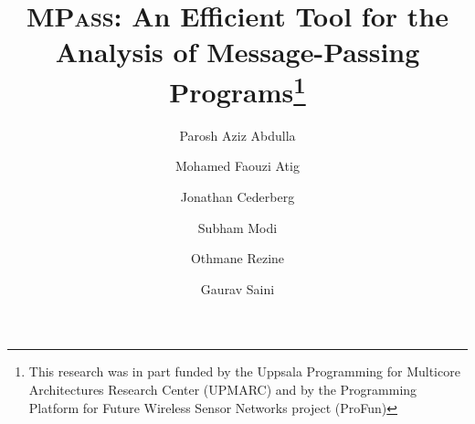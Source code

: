 \documentclass{llncs}
\newcommand{\MPass}{\textsc{MPass}}
\begin{document}
\title{\MPass:  An Efficient  Tool for the Analysis of Message-Passing Programs\thanks{This research was in part funded by the
    Uppsala Programming for Multicore Architectures Research Center
    (UPMARC)
    and by the Programming Platform for Future Wireless Sensor Networks project (ProFun)}
    }

\author{Parosh Aziz Abdulla \and Mohamed Faouzi Atig \and Jonathan Cederberg \and Subham Modi \and Othmane Rezine \and Gaurav Saini  }

\maketitle




% 


% 





\newpage
{}
{}




\end{document}
